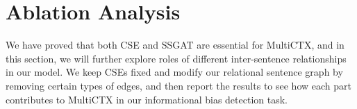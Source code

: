 \section{Ablation Analysis}


We have proved that both CSE and SSGAT are essential for MultiCTX, and in this section, we will further explore roles of different inter-sentence relationships in our model. We keep CSEs fixed and modify our relational sentence graph by removing certain types of edges, and then report the results to see how each part contributes to MultiCTX in our informational bias detection task.

